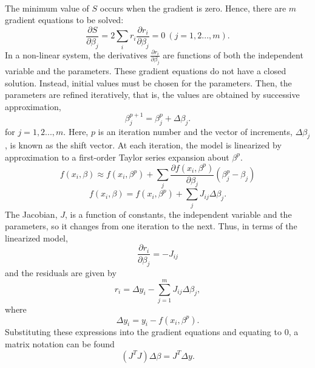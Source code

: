 \documentclass[a4paper,10pt]{report}
\begin{document}
\paragraph*{}
The minimum value of $S$ occurs when the gradient is zero. Hence, there are $m$ gradient equations to be solved:
\begin{equation}
    \frac{\partial S}{\partial \beta_j}=2\sum_i r_i\frac{\partial r_i}{\partial \beta_j}=0 \ (j=1,2...,m).
\end{equation}
In a non-linear system, the derivatives $\frac{\partial r_i}{\partial \beta_j}$ are functions of both the independent
variable and the parameters. These gradient equations do not have a
closed solution. Instead, initial values must be chosen for the
parameters. Then, the parameters are refined iteratively, that is,
the values are obtained by successive approximation,
\begin{equation}
    \beta_j^{p+1}=\beta^p_j+\Delta \beta_j.
\end{equation}
for $j=1,2...,m.$ Here, $p$ is an iteration number and the vector of increments, $\Delta \beta_j$, is known as the shift vector. At each iteration, the model is linearized by approximation to a first-order Taylor series expansion about $\beta^p$.
\begin{equation}
    f(x_i,\beta)\approx f(x_i,\beta^p) +\sum_j \frac{\partial f(x_i, \beta^p)}{\partial \beta_j} \left(\beta^p_j -\beta_j \right)
\end{equation}
\begin{equation}
 f(x_i,\beta) =f(x_i, \beta^p)+\sum_j J_{ij} \Delta\beta_j.
\end{equation}
The Jacobian, $J$, is a function of constants, the independent variable and the parameters, so it changes from one iteration to the
next. Thus, in terms of the linearized model,
\begin{equation}
\frac{\partial r_i}{\partial \beta_j}=-J_{ij}
\end{equation}
and the residuals are given by
\begin{equation}
    r_i=\Delta y_i- \sum_{j=1}^{m} J_{ij}\Delta\beta_j,
\end{equation}
where
\begin{equation}
 \Delta y_i=y_i- f(x_i, \beta^p).
\end{equation}
Substituting these expressions into the gradient equations and
equating to $0$, a matrix notation can be found
\begin{equation}
    \left(J^TJ\right)\Delta  \beta=J^T\Delta y.
\end{equation}
\end{document}
